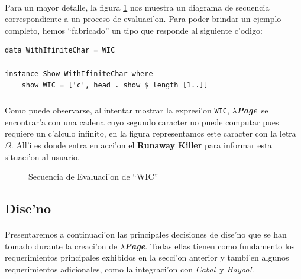\documentclass[a4paper]{article}
\newcommand{\hpage}{\textbf{\textsl{$\lambda$Page}}}
\newcommand{\cabal}{\textsl{Cabal}}
\begin{document}
\paragraph{}Para un mayor detalle, la figura \ref{seq1} nos muestra un diagrama de secuencia correspondiente a un proceso de evaluaci'on.  Para poder brindar un ejemplo completo, hemos ``fabricado'' un tipo que responde al siguiente c'odigo:
\lstset{language=haskell, frame=single, tabsize=4}
\begin{lstlisting}
data WithIfiniteChar = WIC

instance Show WithIfiniteChar where
    show WIC = ['c', head . show $ length [1..]]
\end{lstlisting}
\subparagraph{}Como puede observarse, al intentar mostrar la expresi'on \texttt{WIC}, \hpage\ se encontrar'a con una cadena cuyo segundo caracter no puede computar pues requiere un c'alculo infinito, en la figura representamos este caracter con la letra $\Omega$.  All'i es donde entra en acci'on el \textbf{Runaway Killer} para informar esta situaci'on al usuario.
\begin{figure}[hp]
	\begin{center}
		\caption{Secuencia de Evaluaci'on de ``WIC''}
		\label{seq1}
	\end{center}
\end{figure}

\subsection{Dise'no}
\begin{epigraphs}
\end{epigraphs}
\paragraph{}Presentaremos a continuaci'on las principales decisiones de dise'no que se han tomado durante la creaci'on de \hpage.  Todas ellas tienen como fundamento los requerimientos principales exhibidos en la secci'on anterior y tambi'en algunos requerimientos adicionales, como la integraci'on con \cabal\ y \textsl{Hayoo!}.
\end{document}
